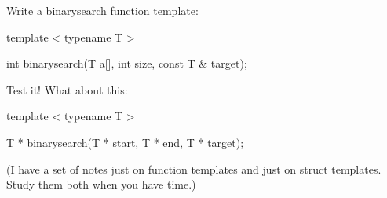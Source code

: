 Write a binarysearch function template:



\begin{console}

template  < typename T >

int binarysearch(T a[], int size, const T & target); 

\end{console}



Test it! What about this:



\begin{console}

template  < typename T >

T * binarysearch(T * start, T * end, T * target); 

\end{console}



(I have a set of notes just on function templates and just on struct templates. Study them both when you have time.)

